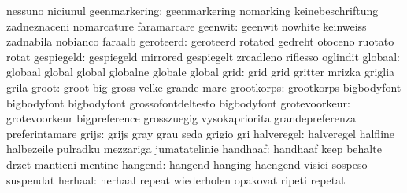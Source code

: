                            nessuno                   niciunul
            geenmarkering: geenmarkering             nomarking
                           keinebeschriftung         zadneznaceni
                           nomarcature               faramarcare
                  geenwit: geenwit                   nowhite
                           keinweiss                 zadnabila
                           nobianco                  faraalb
                geroteerd: geroteerd                 rotated
                           gedreht                   otoceno
                           ruotato                   rotat
               gespiegeld: gespiegeld                mirrored
                           gespiegelt                zrcadleno
                           riflesso                  oglindit
                  globaal: globaal                   global
                           global                    globalne
                           globale                   global
                     grid: grid                      grid
                           gritter                   mrizka
                           griglia                   grila
                    groot: groot                     big
                           gross                     velke
                           grande                    mare
               grootkorps: grootkorps                bigbodyfont
                           bigbodyfont               bigbodyfont
                           grossofontdeltesto        bigbodyfont %
            grotevoorkeur: grotevoorkeur             bigpreference
                           grosszuegig               vysokapriorita
                           grandepreferenza          preferintamare
                    grijs: grijs                     gray
                           grau                      seda
                           grigio                    gri
               halveregel: halveregel                halfline
                           halbezeile                pulradku
                           mezzariga                 jumatatelinie
                 handhaaf: handhaaf                  keep
                           behalte                   drzet
                           mantieni                  mentine
                  hangend: hangend                   hanging
                           haengend                  visici
                           sospeso                   suspendat
                  herhaal: herhaal                   repeat
                           wiederholen               opakovat
                           ripeti                    repetat
